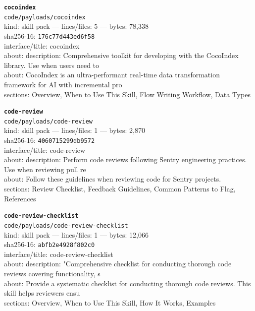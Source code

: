 \noindent\textbf{\texttt{cocoindex}}\\
\texttt{code/payloads/cocoindex}\\
kind: skill pack --- lines/files: 5 --- bytes: 78,338\\
sha256-16: \texttt{176c77d443ed6f58}\\
interface/title: cocoindex\\
about: description: Comprehensive toolkit for developing with the CocoIndex library. Use when users need to\\
about: CocoIndex is an ultra-performant real-time data transformation framework for AI with incremental pro\\
sections: Overview, When to Use This Skill, Flow Writing Workflow, Data Types\\
\vspace*{6.0pt}

\noindent\textbf{\texttt{code-review}}\\
\texttt{code/payloads/code-review}\\
kind: skill pack --- lines/files: 1 --- bytes: 2,870\\
sha256-16: \texttt{4060715299db9572}\\
interface/title: code-review\\
about: description: Perform code reviews following Sentry engineering practices. Use when reviewing pull re\\
about: Follow these guidelines when reviewing code for Sentry projects.\\
sections: Review Checklist, Feedback Guidelines, Common Patterns to Flag, References\\
\vspace*{6.0pt}

\noindent\textbf{\texttt{code-review-checklist}}\\
\texttt{code/payloads/code-review-checklist}\\
kind: skill pack --- lines/files: 1 --- bytes: 12,066\\
sha256-16: \texttt{abfb2e4928f802c0}\\
interface/title: code-review-checklist\\
about: description: "Comprehensive checklist for conducting thorough code reviews covering functionality, s\\
about: Provide a systematic checklist for conducting thorough code reviews. This skill helps reviewers ensu\\
sections: Overview, When to Use This Skill, How It Works, Examples\\
\vspace*{6.0pt}

